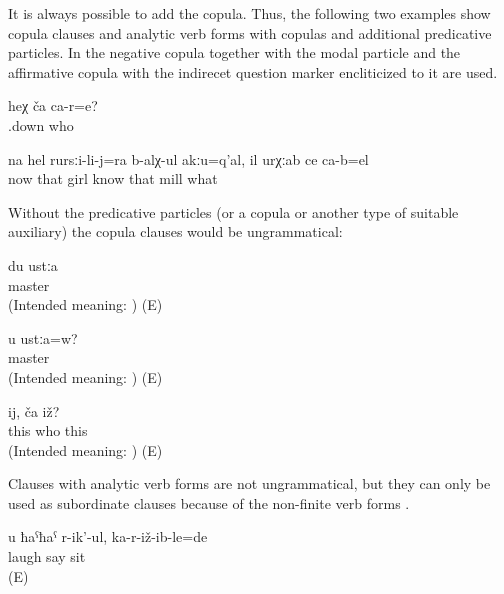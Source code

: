 It is always possible to add the copula. Thus, the following two examples show copula clauses and analytic verb forms with copulas and additional predicative particles. In  the negative copula together with the modal particle and the affirmative copula with the indirecet question marker encliticized to it are used.
%
\begin{exe}
	\ex	\label{ex:Who is she minor}
	\gll	heχ	ča 	ca-r=e?\\
		.down	who	\\
	\glt	{}

	\ex	\label{ex:na hel rursilijra balxul akuqal il urxab ce cabel minor}
	\gll	na	hel	rursːi-li-j=ra	b-alχ-ul akːu=q'al,	il	urχːab	ce	ca-b=el\\
		now	that	girl	know		that	mill	what	\\
	\glt	{}
\end{exe}

Without the predicative particles (or a copula or another type of suitable auxiliary) the copula clauses would be ungrammatical:
%
\begin{exe}
	\ex	\label{ex:I am a master ungrammatical minor}
	\gll	{*}	du	ustːa\\
		{}		master\\
	\glt	(Intended meaning: ) (E)

	\ex	\label{ex:Are you a master ungrammatical minor}
	\gll	{*}	u	ustːa=w?\\
		{}		master\\
	\glt	(Intended meaning: ) (E)

	\ex	\label{ex:This, who is it ungrammatical minor}
	\gll	{*}	ij,	ča	iž?\\
		{}	this	who	this\\
	\glt	(Intended meaning: ) (E)
\end{exe}

Clauses with analytic verb forms are not ungrammatical, but they can only be used as subordinate clauses because of the non-finite verb forms .
%
\begin{exe}
	\ex	\label{ex:You sit and are laughing minor}
	\gll	u	ħaˁħaˁ	r-ik'-ul,	ka-r-iž-ib-le=de\\
			laugh	say	sit\\
	\glt	{} (E)
\end{exe}


